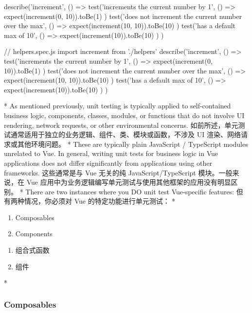 \begin{paracol}{2}
\begin{codeJs}
describe('increment', () => {
  test('increments the current number by 1', () => {
    expect(increment(0, 10)).toBe(1)
  })
  test('does not increment the current number over the max', () => {
    expect(increment(10, 10)).toBe(10)
  })
  test('has a default max of 10', () => {
    expect(increment(10)).toBe(10)
  })
})
\end{codeJs}
\switchcolumn
\begin{codeJs}
// helpers.spec.js
import { increment } from './helpers'
describe('increment', () => {
  test('increments the current number by 1', () => {
    expect(increment(0, 10)).toBe(1)
  })
  test('does not increment the current number over the max', () => {
    expect(increment(10, 10)).toBe(10)
  })
  test('has a default max of 10', () => {
    expect(increment(10)).toBe(10)
  })
})
\end{codeJs}
\switchcolumn[0]*%
As mentioned previously, unit testing is typically applied to
self-contained business logic, components, classes, modules, or
functions that do not involve UI rendering, network requests, or other
environmental concerns.
\switchcolumn
如前所述，单元测试通常适用于独立的业务逻辑、组件、类、模块或函数，不涉及
UI 渲染、网络请求或其他环境问题。
\switchcolumn[0]*%
These are typically plain JavaScript / TypeScript modules unrelated to
Vue. In general, writing unit tests for business logic in Vue
applications does not differ significantly from applications using other
frameworks.
\switchcolumn
这些通常是与 Vue 无关的纯 JavaScript/TypeScript 模块。一般来说，在 Vue
应用中为业务逻辑编写单元测试与使用其他框架的应用没有明显区别。
\switchcolumn[0]*%
There are two instances where you DO unit test Vue-specific features:
\switchcolumn
但有两种情况，你必须对 Vue 的特定功能进行单元测试：
\switchcolumn[0]*%
\begin{enumerate}
\item
  Composables
\item
  Components
\end{enumerate}
\switchcolumn
\begin{enumerate}
\item
  组合式函数
\item
  组件
\end{enumerate}
\switchcolumn[0]*%
\subsubsection{Composables}
\switchcolumn

\end{paracol}
